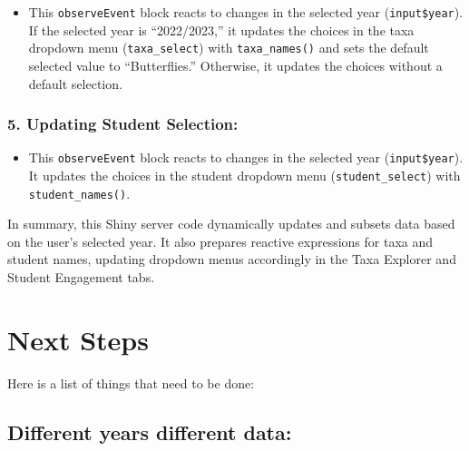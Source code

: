 \documentclass[
]{book}
\newenvironment{Shaded}{\begin{snugshade}}{\end{snugshade}}
\newcommand{\AttributeTok}[1]{\textcolor[rgb]{0.13,0.29,0.53}{#1}}
\newcommand{\ConstantTok}[1]{\textcolor[rgb]{0.56,0.35,0.01}{#1}}
\newcommand{\FunctionTok}[1]{\textcolor[rgb]{0.13,0.29,0.53}{\textbf{#1}}}
\newcommand{\NormalTok}[1]{#1}
\newcommand{\SpecialCharTok}[1]{\textcolor[rgb]{0.81,0.36,0.00}{\textbf{#1}}}
\newcommand{\StringTok}[1]{\textcolor[rgb]{0.31,0.60,0.02}{#1}}
\providecommand{\tightlist}{%
  \setlength{\itemsep}{0pt}\setlength{\parskip}{0pt}}
\begin{document}
\begin{itemize}
\tightlist
\item
  This \texttt{observeEvent} block reacts to changes in the selected year (\texttt{input\$year}). If the selected year is ``2022/2023,'' it updates the choices in the taxa dropdown menu (\texttt{taxa\_select}) with \texttt{taxa\_names()} and sets the default selected value to ``Butterflies.'' Otherwise, it updates the choices without a default selection.
\end{itemize}

\hypertarget{updating-student-selection}{%
\subsection{5. Updating Student Selection:}\label{updating-student-selection}}

\begin{Shaded}
\end{Shaded}

\begin{itemize}
\tightlist
\item
  This \texttt{observeEvent} block reacts to changes in the selected year (\texttt{input\$year}). It updates the choices in the student dropdown menu (\texttt{student\_select}) with \texttt{student\_names()}.
\end{itemize}

In summary, this Shiny server code dynamically updates and subsets data based on the user's selected year. It also prepares reactive expressions for taxa and student names, updating dropdown menus accordingly in the Taxa Explorer and Student Engagement tabs.

\hypertarget{next-steps}{%
\chapter{Next Steps}\label{next-steps}}

Here is a list of things that need to be done:

\hypertarget{different-years-different-data}{%
\section{Different years different data:}\label{different-years-different-data}}
\end{document}

